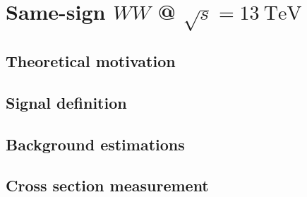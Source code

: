 \chapter[Same-sign $WW$ @ $\sqrt{s} = 13~\mathrm{TeV}$][Same-sign $WW$ @ $\sqrt{s} = 13~\mathrm{TeV}$]{Same-sign $WW$ @ $\sqrt{s} = 13~\mathrm{TeV}$}
\label{ch:ssww13tev}

\section{Theoretical motivation}\label{ssww13tev:theory}


\section{Signal definition}\label{ssww13tev:signal}


\section{Background estimations}\label{ssww13tev:background}


\section{Cross section measurement}\label{ssww13tev:xsec}

